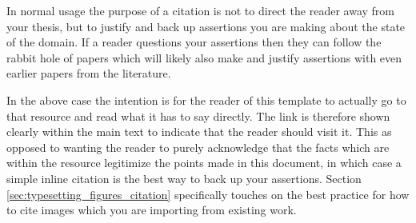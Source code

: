 		In normal usage the purpose of a citation is not to direct the reader away from your thesis, but to justify and back up assertions you are making about the state of the domain. If a reader questions your assertions then they can follow the rabbit hole of papers which will likely also make and justify assertions with even earlier papers from the literature. 
		
		In the above case the intention is for the reader of this template to actually go to that resource and read what it has to say directly. The link is therefore shown clearly within the main text to indicate that the reader should visit it. This as opposed to wanting the reader to purely acknowledge that the facts which are within the resource legitimize the points made in this document, in which case a simple inline citation is the best way to back up your assertions. Section \ref{sec:typesetting_figures_citation} specifically touches on the best practice for how to cite images which you are importing from existing work. 
